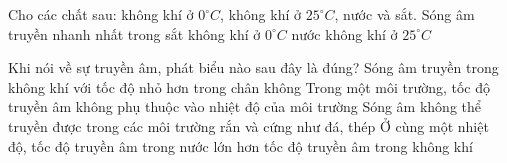  \begin{ex}%
Cho các chất sau: không khí ở $0^\circ C$, không khí ở $25^\circ C$, nước và sắt. Sóng âm truyền nhanh nhất trong
\choice
{\True sắt}
{không khí ở $0^\circ C$}
{nước}
{không khí ở $25^\circ C$}
\end{ex} 
\begin{ex}%
Khi nói về sự truyền âm, phát biểu nào sau đây là đúng?
\choice
{Sóng âm truyền trong không khí với tốc độ nhỏ hơn trong chân không}
{Trong một môi trường, tốc độ truyền âm không phụ thuộc vào nhiệt độ của môi trường}
{Sóng âm không thể truyền được trong các môi trường rắn và cứng như đá, thép}
{\True Ở cùng một nhiệt độ, tốc độ truyền âm trong nước lớn hơn tốc độ truyền âm trong không khí}
\end{ex} 

